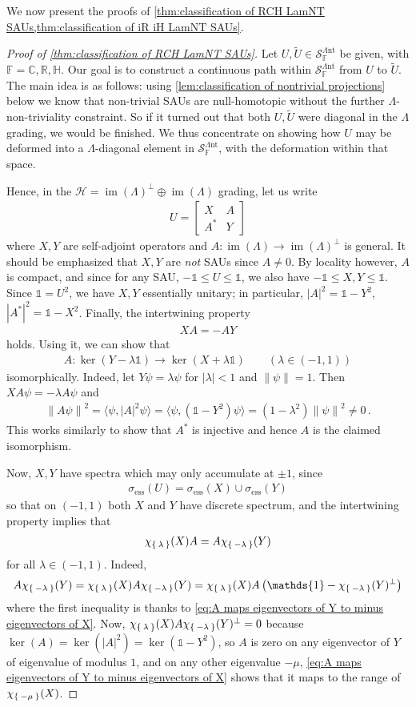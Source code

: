 \documentclass[a4paper,10pt]{article}
\numberwithin{equation}{section}
\theoremstyle{plain}
\theoremstyle{plain}
\theoremstyle{plain}
\theoremstyle{plain}
\theoremstyle{plain}
\theoremstyle{remark}
\theoremstyle{definition}
\theoremstyle{plain}
\newcommand{\RR}{\mathbb{R}}
\newcommand{\CC}{\mathbb{C}}
\newcommand{\FF}{\mathbb{F}}
\newcommand{\calSU}{\mathcal{S}}
\newcommand{\calH}{\mathcal{H}}
\newcommand{\LamNT}{\Lambda\mathrm{nt}}
\newcommand{\LamNTSAU}{\calSU^{\LamNT}}
\newcommand\norm[1]{\left\lVert#1\right\rVert}
\newcommand{\ip}[2]{\langle #1, #2 \rangle}
\newcommand{\Id}{\mathds{1}}
\newcommand{\HH}{\mathbb{H}}
\newcommand{\im}{\operatorname{im}}
\newcommand{\eq}[1]{\begin{align*}#1\end{align*}}
\newcommand{\eql}[1]{\begin{align}#1\end{align}}
\begin{document}
	We now present the proofs of \cref{thm:classification of RCH LamNT SAUs,thm:classification of iR iH LamNT SAUs}.
	\begin{proof}[Proof of \cref{thm:classification of RCH LamNT SAUs}]
		Let $U,\widetilde{U}\in\LamNTSAU_{\FF}$ be given, with $\FF=\CC,\RR,\HH$. Our goal is to construct a continuous path within $\LamNTSAU_{\FF}$ from $U$ to $\widetilde{U}$. The main idea is as follows: using \cref{lem:classification of nontrivial projections} below we know that non-trivial SAUs are null-homotopic without the further $\Lambda$-non-triviality constraint. So if it turned out that both $U,\widetilde{U}$ were diagonal in the $\Lambda$ grading, we would be finished. We thus concentrate on showing how $U$ may be deformed into a $\Lambda$-diagonal element in $\LamNTSAU_\FF$, with the deformation within that space.
		
		Hence, in the $\calH = \im(\Lambda)^\perp\oplus\im(\Lambda)$ grading, let us write \eql{\label{eq:space decomposition of SA unitary}U = \begin{bmatrix}
				X & A \\ A^\ast & Y
		\end{bmatrix}} where $X,Y$ are self-adjoint operators and $A:\im(\Lambda)\to\im(\Lambda)^\perp$ is general. It should be emphasized that $X,Y$ are \emph{not} SAUs since $A\neq0$. By locality however, $A$ is compact, and since for any SAU, $-\Id\leq U\leq\Id$, we also have $-\Id\leq X,Y\leq \Id$. Since $\Id=U^2$, we have $X,Y$ essentially unitary; in particular, $|A|^2 = \Id-Y^2$, $|A^\ast|^2=\Id-X^2$. Finally, the intertwining property \eql{\label{eq:intertwining property XA=minus AY}XA = -A Y} holds. Using it, we can show that \eql{\label{eq:A maps eigenvectors of Y to minus eigenvectors of X}A:\ker(Y-\lambda\Id)\to\ker(X+\lambda\Id)\qquad(\lambda\in(-1,1))} isomorphically. Indeed, let $Y\psi = \lambda \psi$ for $|\lambda|<1$ and $\norm{\psi}=1$. Then $XA\psi=-\lambda A\psi$ and \eql{\label{eq:eigenvectors of Y mapped by A to eigenvectors of X}\norm{A\psi}^2=\ip{\psi}{|A|^2\psi}=\ip{\psi}{(\Id-Y^2)\psi}=(1-\lambda^2)\norm{\psi}^2\neq0\,.} This works similarly to show that $A^\ast$ is injective and hence $A$ is the claimed isomorphism.
		
		Now, $X,Y$ have spectra which may only accumulate at $\pm1$, since \eq{\sigma_{\mathrm{ess}}(U) = \sigma_{\mathrm{ess}}(X)\cup\sigma_{\mathrm{ess}}(Y)} so that on $(-1,1)$ both $X$ and $Y$ have discrete spectrum, and the intertwining property implies that \eql{\label{eq:spectral projections flip via A}\chi_{\Set{\lambda}}(X) A = A \chi_{\Set{-\lambda}}(Y)} for all $\lambda\in(-1,1)$. Indeed, \eq{A \chi_{\Set{-\lambda}}(Y) = \chi_{\Set{\lambda}}(X) A \chi_{\Set{-\lambda}}(Y) = \chi_{\Set{\lambda}}(X) A \left(\Id-\chi_{\Set{-\lambda}}(Y)^\perp\right)
		} where the first inequality is thanks to \cref{eq:A maps eigenvectors of Y to minus eigenvectors of X}. Now, $\chi_{\Set{\lambda}}(X) A \chi_{\Set{-\lambda}}(Y)^\perp=0$ because $\ker(A)=\ker(|A|^2)=\ker(\Id-Y^2)$, so $A$ is zero on any eigenvector of $Y$ of eigenvalue of modulus $1$, and on any other eigenvalue $-\mu$, \cref{eq:A maps eigenvectors of Y to minus eigenvectors of X} shows that it maps to the range of $\chi_{\Set{-\mu}}(X)$.
		

\end{proof}
\end{document}
